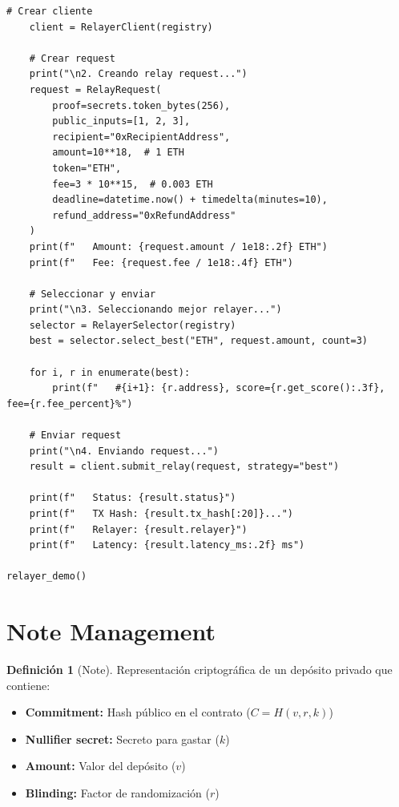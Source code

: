 \documentclass[11pt,a4paper,twoside]{book}
\theoremstyle{definition}
\newtheorem{definition}{Definición}[chapter]
\theoremstyle{remark}
\begin{document}
\begin{lstlisting}[style=python, caption={Sistema de relayers descentralizado}]
    # Crear cliente
    client = RelayerClient(registry)
    
    # Crear request
    print("\n2. Creando relay request...")
    request = RelayRequest(
        proof=secrets.token_bytes(256),
        public_inputs=[1, 2, 3],
        recipient="0xRecipientAddress",
        amount=10**18,  # 1 ETH
        token="ETH",
        fee=3 * 10**15,  # 0.003 ETH
        deadline=datetime.now() + timedelta(minutes=10),
        refund_address="0xRefundAddress"
    )
    print(f"   Amount: {request.amount / 1e18:.2f} ETH")
    print(f"   Fee: {request.fee / 1e18:.4f} ETH")
    
    # Seleccionar y enviar
    print("\n3. Seleccionando mejor relayer...")
    selector = RelayerSelector(registry)
    best = selector.select_best("ETH", request.amount, count=3)
    
    for i, r in enumerate(best):
        print(f"   #{i+1}: {r.address}, score={r.get_score():.3f}, fee={r.fee_percent}%")
    
    # Enviar request
    print("\n4. Enviando request...")
    result = client.submit_relay(request, strategy="best")
    
    print(f"   Status: {result.status}")
    print(f"   TX Hash: {result.tx_hash[:20]}...")
    print(f"   Relayer: {result.relayer}")
    print(f"   Latency: {result.latency_ms:.2f} ms")

relayer_demo()
\end{lstlisting}

\section{Note Management}
\label{sec:note-management}

\begin{definition}[Note]
Representación criptográfica de un depósito privado que contiene:
\begin{itemize}
    \item \textbf{Commitment:} Hash público en el contrato ($C = H(v, r, k)$)
    \item \textbf{Nullifier secret:} Secreto para gastar ($k$)
    \item \textbf{Amount:} Valor del depósito ($v$)
    \item \textbf{Blinding:} Factor de randomización ($r$)
\end{itemize}
\end{definition}
\end{document}

